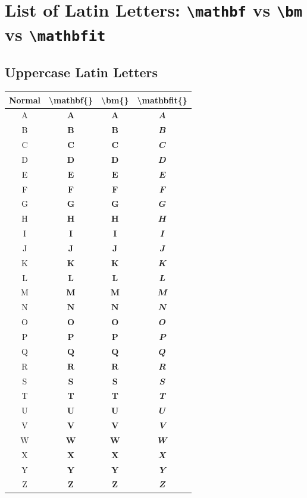 \documentclass[12pt,a4paper]{article}
\begin{document}
\section*{List of Latin Letters: \texttt{\textbackslash{}mathbf} vs \texttt{\textbackslash{}bm} vs \texttt{\textbackslash{}mathbfit}}

\subsection*{Uppercase Latin Letters}

\begin{longtable}{|c|c|c|c|}
\hline
\textbf{Normal} & \textbf{\textbackslash{}mathbf\{\}} & \textbf{\textbackslash{}bm\{\}} & \textbf{\textbackslash{}mathbfit\{\}} \\
\hline
A & $\mathbf{A}$ & $\bm{A}$ & $\mathbfit{A}$ \\ %
B & $\mathbf{B}$ & $\bm{B}$ & $\mathbfit{B}$ \\ %
C & $\mathbf{C}$ & $\bm{C}$ & $\mathbfit{C}$ \\ %
D & $\mathbf{D}$ & $\bm{D}$ & $\mathbfit{D}$ \\ %
E & $\mathbf{E}$ & $\bm{E}$ & $\mathbfit{E}$ \\ %
F & $\mathbf{F}$ & $\bm{F}$ & $\mathbfit{F}$ \\ %
G & $\mathbf{G}$ & $\bm{G}$ & $\mathbfit{G}$ \\ %
H & $\mathbf{H}$ & $\bm{H}$ & $\mathbfit{H}$ \\ %
I & $\mathbf{I}$ & $\bm{I}$ & $\mathbfit{I}$ \\ %
J & $\mathbf{J}$ & $\bm{J}$ & $\mathbfit{J}$ \\ %
K & $\mathbf{K}$ & $\bm{K}$ & $\mathbfit{K}$ \\ %
L & $\mathbf{L}$ & $\bm{L}$ & $\mathbfit{L}$ \\ %
M & $\mathbf{M}$ & $\bm{M}$ & $\mathbfit{M}$ \\ %
N & $\mathbf{N}$ & $\bm{N}$ & $\mathbfit{N}$ \\ %
O & $\mathbf{O}$ & $\bm{O}$ & $\mathbfit{O}$ \\ %
P & $\mathbf{P}$ & $\bm{P}$ & $\mathbfit{P}$ \\ %
Q & $\mathbf{Q}$ & $\bm{Q}$ & $\mathbfit{Q}$ \\ %
R & $\mathbf{R}$ & $\bm{R}$ & $\mathbfit{R}$ \\ %
S & $\mathbf{S}$ & $\bm{S}$ & $\mathbfit{S}$ \\ %
T & $\mathbf{T}$ & $\bm{T}$ & $\mathbfit{T}$ \\ %
U & $\mathbf{U}$ & $\bm{U}$ & $\mathbfit{U}$ \\ %
V & $\mathbf{V}$ & $\bm{V}$ & $\mathbfit{V}$ \\ %
W & $\mathbf{W}$ & $\bm{W}$ & $\mathbfit{W}$ \\ %
X & $\mathbf{X}$ & $\bm{X}$ & $\mathbfit{X}$ \\ %
Y & $\mathbf{Y}$ & $\bm{Y}$ & $\mathbfit{Y}$ \\ %
Z & $\mathbf{Z}$ & $\bm{Z}$ & $\mathbfit{Z}$ \\ %
\hline
\end{longtable}
\end{document}
